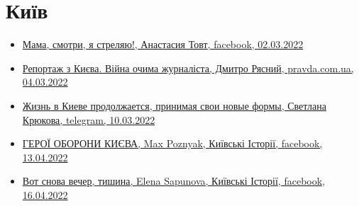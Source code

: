  
 
 
 
 

\section{Київ}
\label{sec:topics.vojna.kiev}

\begin{itemize} %
\item \hyperlink{02_03_2022.fb.tovt_anastasia.1.mama_smotri_ja_streljaju}{%
Мама, смотри, я стреляю!, Анастасия Товт, facebook, 02.03.2022%
}

\item \hyperlink{04_03_2022.stz.news.ua.pravda.1.reportazh_z_kieva}{%
Репортаж з Києва. Війна очима журналіста, Дмитро Рясний, pravda.com.ua, 04.03.2022%
}

\item \hyperlink{10_03_2022.tg.krjukova_svetlana.1.zhizn_v_kieve}{%
Жизнь в Киеве продолжается, принимая свои новые формы, Светлана Крюкова, telegram, 10.03.2022
}


\item \hyperlink{13_04_2022.fb.fb_group.story_kiev_ua.1.geroi_oborony_kieva}{%
ГЕРОЇ ОБОРОНИ КИЄВА, Max Poznyak, Київські Історії, facebook, 13.04.2022%
}

\item \hyperlink{16_04_2022.fb.fb_group.story_kiev_ua.1.vecher_tishina}{%
Вот снова вечер, тишина, Elena Sapunova, Київські Історії, facebook, 16.04.2022%
}

\end{itemize} %

